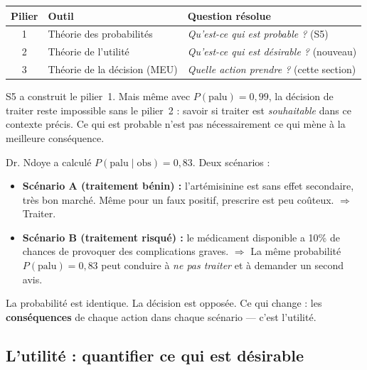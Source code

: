 \documentclass[11pt,a4paper]{article}
\begin{document}
\begin{center}
\renewcommand{\arraystretch}{1.5}
\begin{tabular}{clp{7cm}}
\toprule
\textbf{Pilier} & \textbf{Outil} & \textbf{Question résolue} \\
\midrule
1 & Théorie des probabilités & \textit{Qu'est-ce qui est probable ?} (S5) \\
2 & Théorie de l'utilité       & \textit{Qu'est-ce qui est désirable ?} (nouveau) \\
3 & Théorie de la décision (MEU) & \textit{Quelle action prendre ?} (cette section) \\
\bottomrule
\end{tabular}
\end{center}

S5 a construit le pilier~1. Mais même avec $P(\text{palu}) = 0{,}99$, la décision de traiter reste impossible sans le pilier~2 : savoir si traiter est \textit{souhaitable} dans ce contexte précis. Ce qui est probable n'est pas nécessairement ce qui mène à la meilleure conséquence.

\begin{exemplebox}
Dr. Ndoye a calculé $P(\text{palu} \mid \text{obs}) = 0{,}83$. Deux scénarios :
\begin{itemize}[nosep]
    \item \textbf{Scénario A (traitement bénin) :} l'artémisinine est sans effet secondaire, très bon marché. Même pour un faux positif, prescrire est peu coûteux. $\Rightarrow$ Traiter.
    \item \textbf{Scénario B (traitement risqué) :} le médicament disponible a 10\% de chances de provoquer des complications graves. $\Rightarrow$ La même probabilité $P(\text{palu}) = 0{,}83$ peut conduire à \textit{ne pas traiter} et à demander un second avis.
\end{itemize}
La probabilité est identique. La décision est opposée. Ce qui change : les \textbf{conséquences} de chaque action dans chaque scénario --- c'est l'utilité.
\end{exemplebox}

\subsection{L'utilité : quantifier ce qui est désirable}
\end{document}
